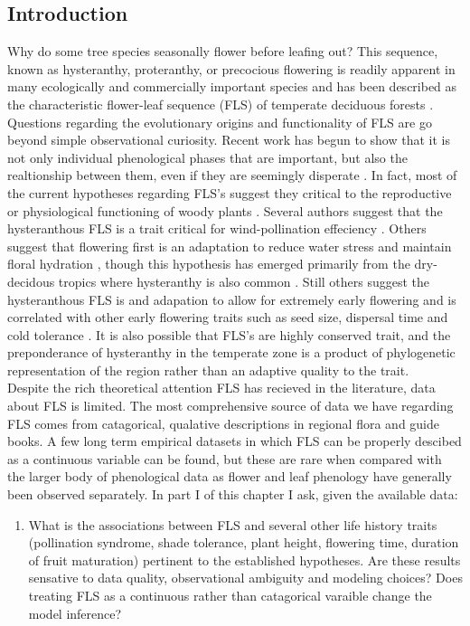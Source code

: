 \documentclass{article}\usepackage[]{graphicx}\usepackage[]{color}
\begin{document}
{{\subsection*{Introduction}
Why do some tree species seasonally flower before leafing out? This sequence, known as hysteranthy, proteranthy, or precocious flowering is readily apparent in many ecologically and commercially important species and has been described as  the characteristic flower-leaf sequence (FLS) of temperate deciduous forests \citep{}. Questions regarding the evolutionary origins and functionality of FLS are go beyond simple observational curiosity. Recent work has begun to show that it is not only individual phenological phases that are important, but also the realtionship between them, even if they are seemingly disperate \citep{}. In fact, most of the current hypotheses regarding FLS's suggest they critical to the reproductive or physiological functioning of woody plants \citep{}. Several authors suggest that the hysteranthous FLS is a trait critical for wind-pollination effeciency \citep{}. Others suggest that flowering first is an adaptation to reduce water stress and maintain floral hydration \citep{}, though this hypothesis has emerged primarily from the dry-decidous tropics where hysteranthy is also common \citep{}.  Still others suggest the hysteranthous FLS is and adapation to allow for extremely early flowering and is correlated with other early flowering traits such as seed size, dispersal time and cold tolerance \citep{}. It is also possible that FLS's are highly conserved trait, and the preponderance of hysteranthy in the temperate zone is a product of phylogenetic representation of the region rather than an adaptive quality to the trait.\\
\indent Despite the rich theoretical attention FLS has recieved in the literature, data about FLS is limited. The most comprehensive source of data we have regarding FLS comes from catagorical, qualative descriptions in regional flora and guide books. A few long term empirical datasets in which FLS can be properly descibed as a continuous variable can be found, but these are rare when compared with the larger body of phenological data as flower and leaf phenology have generally been observed separately{}. In part I of this chapter I ask, given the available data:
\begin{enumerate}
\item  What is the associations between FLS and several other life history traits (pollination syndrome, shade tolerance, plant height, flowering time, duration of fruit maturation) pertinent to the established hypotheses. Are these results sensative to data quality, observational ambiguity and modeling choices? Does treating FLS as a continuous rather than catagorical varaible change the model inference?

\end{enumerate}}}
\end{document}
